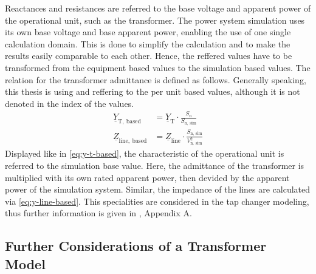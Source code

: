 Reactances and resistances are referred to the base voltage and apparent power of the operational unit, such as the transformer. 
The power system simulation uses its own base voltage and base apparent power, enabling the use of one single calculation domain. 
This is done to simplify the calculation and to make the results easily comparable to each other. 
Hence, the reffered values have to be transformed from the equipment based values to the simulation based values. 
The relation for the transformer admittance is defined as follows. 
Generally speaking, this thesis is using and reffering to the per unit based values, although it is not denoted in the index of the values.
\begin{align}
    \underline{Y}_\mathrm{T,~based}&=\underline{Y}_\mathrm{T} \cdot \frac{S_\mathrm{n}}{S_\mathrm{n,~sim}} \label{eq:y-t-based} \\[6pt]
    \underline{Z}_\mathrm{line,~based}&=\underline{Z}_\mathrm{line} \cdot \frac{S_\mathrm{n,~sim}}{V_\mathrm{n,~sim}^2} \label{eq:y-line-based}
\end{align}
Displayed like in \autoref{eq:y-t-based}, the characteristic of the operational unit is referred to the simulation base value. 
Here, the admittance of the transformer is multiplied with its own rated apparent power, then devided by the apparent power of the simulation system. 
Similar, the impedance of the lines are calculated via \autoref{eq:y-line-based}. 
This specialities are considered in the tap changer modeling, thus further information is given in \autocite{machowski_2020}, Appendix A.

\subsection{Further Considerations of a Transformer Model}
\label{sec:further-considerations}


